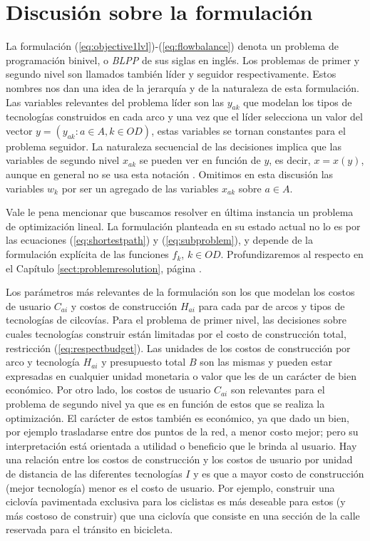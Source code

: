 \section*{Discusión sobre la formulación}

La formulación (\ref{eq:objective1lvl})-(\ref{eq:flowbalance}) denota un problema de programación binivel, o {\it BLPP} de sus siglas en inglés. Los problemas de primer y segundo nivel son llamados también líder y seguidor respectivamente. Estos nombres nos dan una idea de la jerarquía y de la naturaleza de esta formulación. Las variables relevantes del problema líder son las $y_{ak}$ que modelan los tipos de tecnologías construidos en cada arco y una vez que el líder selecciona un valor del vector $y = \left( y_{ak}: a \in A, k \in OD \right)$, estas variables se tornan constantes para el problema seguidor. La naturaleza secuencial de las decisiones implica que las variables de segundo nivel $x_{ak}$ se pueden ver en función de $y$, es decir, $x = x(y)$, aunque en general no se usa esta notación \parencite{bardbook}. Omitimos en esta discusión las variables $w_k$ por ser un agregado de las variables $x_{ak}$ sobre $a \in A$.

Vale le pena mencionar que buscamos resolver en última instancia un problema de optimización lineal. La formulación planteada en su estado actual no lo es por las ecuaciones (\ref{eq:shortestpath}) y (\ref{eq:subproblem}), y depende de la formulación explícita de las funciones $f_k$, $k \in OD$. Profundizaremos al respecto en el Capítulo \ref{sect:problemresolution}, página \pageref{sect:problemresolution}.


Los parámetros más relevantes de la formulación son los que modelan los costos de usuario $C_{ai}$ y costos de construcción $H_{ai}$ para cada par de arcos y tipos de tecnologías de cilcovías. Para el problema de primer nivel, las decisiones sobre cuales tecnologías construir están limitadas por el costo de construcción total, restricción (\ref{eq:respectbudget}). Las unidades de los costos de construcción por arco y tecnología $H_{ai}$ y presupuesto total $B$ son las mismas y pueden estar expresadas en cualquier unidad monetaria o valor que les de un carácter de bien económico. Por otro lado, los costos de usuario $C_{ai}$ son relevantes para el problema de segundo nivel ya que es en función de estos que se realiza la optimización. El carácter de estos también es económico, ya que dado un bien, por ejemplo trasladarse entre dos puntos de la red, a menor costo mejor; pero su interpretación está orientada a utilidad o beneficio que le brinda al usuario. Hay una relación entre los costos de construcción y los costos de usuario por unidad de distancia de las diferentes tecnologías $I$ y es que a mayor costo de construcción (mejor tecnología) menor es el costo de usuario. Por ejemplo, construir una ciclovía pavimentada exclusiva para los ciclistas es más deseable para estos (y más costoso de construir) que una ciclovía que consiste en una sección de la calle reservada para el tránsito en bicicleta.

